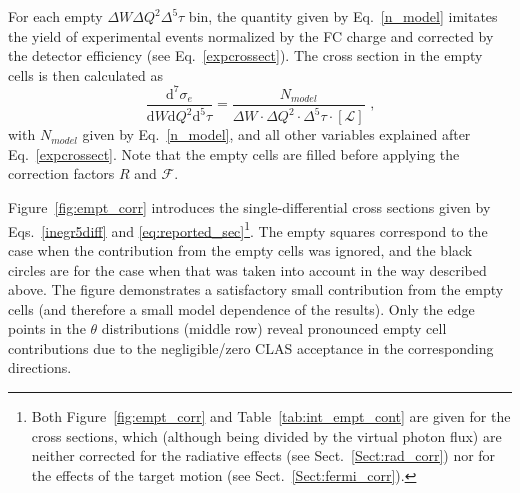 For each empty $\Delta W\Delta Q^2\Delta^{5}\tau$ bin, the quantity given by Eq.~\eqref{n_model} imitates the yield of experimental events normalized by the FC charge and corrected by the detector efficiency (see Eq.~\eqref{expcrossect}). The cross section in the empty cells is then calculated as
\begin{equation}
\frac{\textrm{d}^{7}\sigma_{e}}{\textrm{d}W\textrm{d}Q^{2}\textrm{d}^{5}\tau} = \frac{N_{model}}{
\Delta W \! \cdot \! \Delta Q^{2} \! \cdot \! \Delta^{5} \tau \! \cdot \! \left [ \mathcal{L} \right ] }\textrm{ ,}
\label{cr_sect_empt}
\end{equation}
with $N_{model}$ given by Eq.~\eqref{n_model}, and all other variables explained after Eq.~\eqref{expcrossect}. Note that the empty cells are filled before applying the correction factors $R$ and $\mathcal{F}$.


Figure~\ref{fig:empt_corr} introduces the single-differential cross sections given by Eqs.~\eqref{inegr5diff} and \eqref{eq:reported_sec}\footnote[1]{Both Figure~\ref{fig:empt_corr} and Table~\ref{tab:int_empt_cont} are given for the cross sections, which (although being divided by the virtual photon flux) are neither corrected for the radiative effects (see Sect.~\ref{Sect:rad_corr}) nor for the effects of the target motion (see Sect.~\ref{Sect:fermi_corr}). }. The empty squares correspond to the case when the contribution from the empty cells was ignored, and the black circles are for the case when that was taken into account in the way described above. The figure demonstrates a satisfactory small contribution from the empty cells (and therefore a small model dependence of the results). Only the edge points in the $\theta$ distributions (middle row) reveal pronounced empty cell contributions due to the negligible/zero CLAS acceptance in the corresponding directions.

